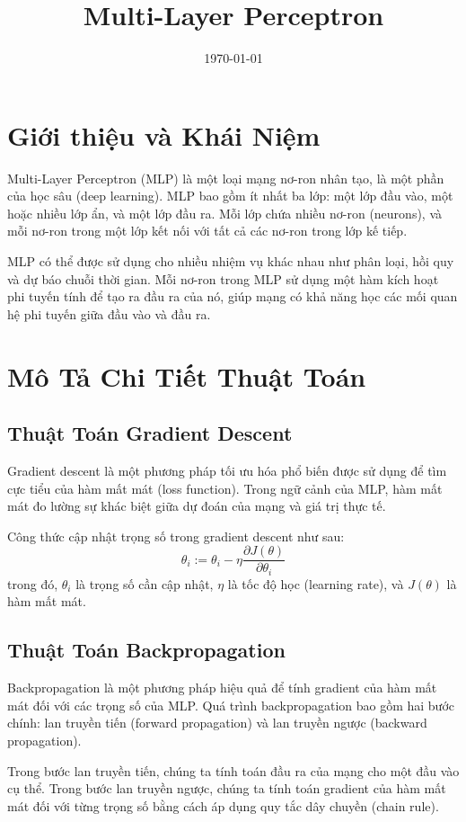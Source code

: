\documentclass[a4paper, 12pt]{article}
\title{Multi-Layer Perceptron}
\date{\today}
\begin{document}
\section{Giới thiệu và Khái Niệm}

Multi-Layer Perceptron (MLP) là một loại mạng nơ-ron nhân tạo, là một phần của học sâu (deep learning). MLP bao gồm ít nhất ba lớp: một lớp đầu vào, một hoặc nhiều lớp ẩn, và một lớp đầu ra. Mỗi lớp chứa nhiều nơ-ron (neurons), và mỗi nơ-ron trong một lớp kết nối với tất cả các nơ-ron trong lớp kế tiếp.

MLP có thể được sử dụng cho nhiều nhiệm vụ khác nhau như phân loại, hồi quy và dự báo chuỗi thời gian. Mỗi nơ-ron trong MLP sử dụng một hàm kích hoạt phi tuyến tính để tạo ra đầu ra của nó, giúp mạng có khả năng học các mối quan hệ phi tuyến giữa đầu vào và đầu ra.

\section{Mô Tả Chi Tiết Thuật Toán}

\subsection{Thuật Toán Gradient Descent}

Gradient descent là một phương pháp tối ưu hóa phổ biến được sử dụng để tìm cực tiểu của hàm mất mát (loss function). Trong ngữ cảnh của MLP, hàm mất mát đo lường sự khác biệt giữa dự đoán của mạng và giá trị thực tế.

Công thức cập nhật trọng số trong gradient descent như sau:
\[
\theta_{i} := \theta_{i} - \eta \frac{\partial J(\theta)}{\partial \theta_{i}}
\]
trong đó, \(\theta_{i}\) là trọng số cần cập nhật, \(\eta\) là tốc độ học (learning rate), và \(J(\theta)\) là hàm mất mát.

\subsection{Thuật Toán Backpropagation}

Backpropagation là một phương pháp hiệu quả để tính gradient của hàm mất mát đối với các trọng số của MLP. Quá trình backpropagation bao gồm hai bước chính: lan truyền tiến (forward propagation) và lan truyền ngược (backward propagation).

Trong bước lan truyền tiến, chúng ta tính toán đầu ra của mạng cho một đầu vào cụ thể. Trong bước lan truyền ngược, chúng ta tính toán gradient của hàm mất mát đối với từng trọng số bằng cách áp dụng quy tắc dây chuyền (chain rule).
\end{document}
